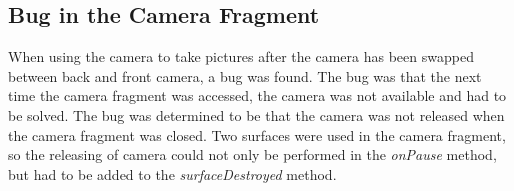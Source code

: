 \subsection*{Bug in the Camera Fragment}
When using the camera to take pictures after the camera has been swapped between back and front camera, a bug was found.
The bug was that the next time the camera fragment was accessed, the camera was not available and had to be solved.
The bug was determined to be that the camera was not released when the camera fragment was closed.
Two surfaces were used in the camera fragment, so the releasing of camera could not only be performed in the \textit{onPause} method, but had to be added to the \textit{surfaceDestroyed} method.